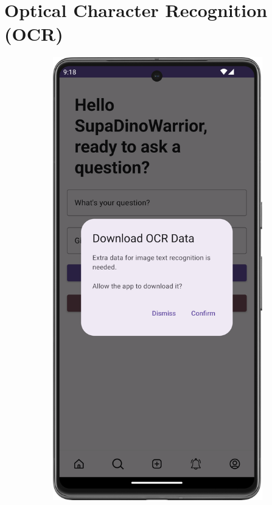 \section{Optical Character Recognition (OCR)}

\begin{figure}[H]
  \begin{subfigure}[b]{0.3\textwidth}
    \includegraphics[width=\textwidth]{Figures/Product_Images/OCR/download_prompt.png}

\end{subfigure}
\end{figure}
